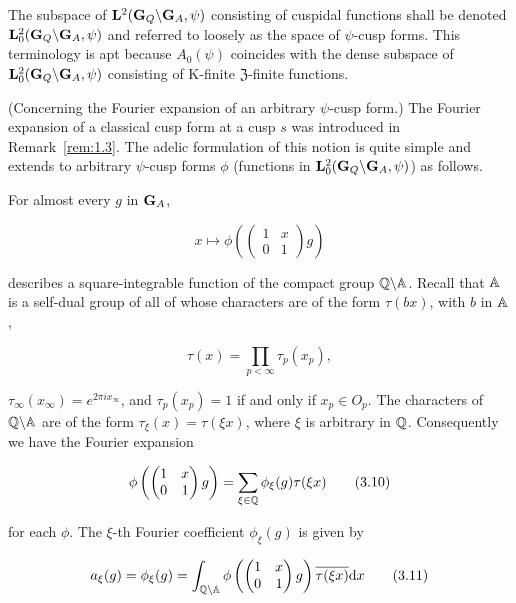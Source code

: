 \begin{remark}\label{rem:3.4}

The subspace of $\mathbf{L}^2(\mathbf{G}_Q\backslash\mathbf{G}_A,\psi)$ consisting of cuspidal functions shall be denoted $\mathbf{L}_0^2(\mathbf{G}_Q\backslash\mathbf{G}_A,\psi)$ and referred to loosely as the space of $\psi$-cusp forms. This terminology is apt because $A_0(\psi)$ coincides with the dense subspace of $\mathbf{L}_0^2(\mathbf{G}_Q\backslash\mathbf{G}_A,\psi)$ consisting of K-finite $\mathfrak{Z}$-finite functions.

\end{remark}

\begin{remark}\label{rem:3.5}

(Concerning the Fourier expansion of an arbitrary $\psi$-cusp form.) The Fourier expansion of a classical cusp form at a cusp $s$ was introduced in Remark~\ref{rem:1.3}. The adelic formulation of this notion is quite simple and extends to arbitrary $\psi$-cusp forms $\phi$ (functions in $\mathbf{L}_0^2(\mathbf{G}_Q\backslash\mathbf{G}_A,\psi)$) as follows.

For almost every $g$ in $\mathbf{G}_A$,

\[
x \mapsto \phi\left(\begin{pmatrix} 1 & x \\ 0 & 1 \end{pmatrix}g\right)
\]

describes a square-integrable function of the compact group $\mathbb{Q}\backslash\mathbb{A}$. Recall that $\mathbb{A}$ is a self-dual group of all of whose characters are of the form $\tau(bx)$, with $b$ in $\mathbb{A}$,

\[
\tau(x) = \prod_{p<\infty}\tau_p(x_p),
\]

$\tau_\infty(x_\infty) = e^{2\pi ix_\infty}$, and $\tau_p(x_p) = 1$ if and only if $x_p \in O_p$. The characters of $\mathbb{Q}\backslash\mathbb{A}$ are of the form $\tau_\xi(x) = \tau(\xi x)$, where $\xi$ is arbitrary in $\mathbb{Q}$. Consequently we have the Fourier expansion

\begin{equation}\label{eq:3.10}
\phi\left(\begin{pmatrix} 1 & x \\ 0 & 1 \end{pmatrix}g\right) = \sum_{\xi\in\mathbb{Q}}\phi_\xi(g)\tau(\xi x)\tag{3.10}
\end{equation}

for each $\phi$. The $\xi$-th Fourier coefficient $\phi_\xi(g)$ is given by

\begin{equation}\label{eq:3.11}
a_\xi(g) = \phi_\xi(g) = \int_{\mathbb{Q}\backslash\mathbb{A}}\phi\left(\begin{pmatrix} 1 & x \\ 0 & 1 \end{pmatrix}g\right)\overline{\tau(\xi x)}\mathrm{d} x\tag{3.11}
\end{equation}


\end{remark}
